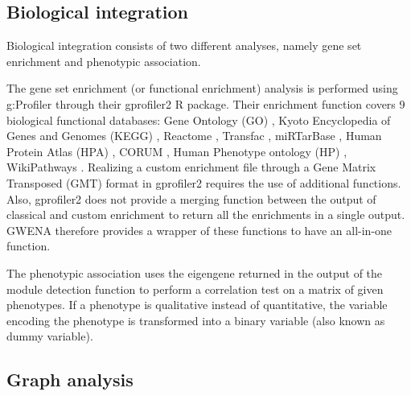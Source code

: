 \subsection{Biological integration}

Biological integration consists of two different analyses, namely gene set enrichment and phenotypic association. 

The gene set enrichment (or functional enrichment) analysis is performed using g:Profiler  through their gprofiler2 R package. Their enrichment function covers 9 biological functional databases: Gene Ontology (GO) , Kyoto Encyclopedia of Genes and Genomes (KEGG) , Reactome , Transfac , miRTarBase , Human Protein Atlas (HPA) , CORUM , Human Phenotype ontology (HP) , WikiPathways . Realizing a custom enrichment file through a Gene Matrix Transposed (GMT) format in gprofiler2 requires the use of additional functions. Also, gprofiler2 does not provide a merging function between the output of classical and custom enrichment to return all the enrichments in a single output. GWENA therefore provides a wrapper of these functions to have an all-in-one function.

The phenotypic association uses the eigengene returned in the output of the module detection function to perform a correlation test on a matrix of given phenotypes. If a phenotype is qualitative instead of quantitative, the variable encoding the phenotype is transformed into a binary variable (also known as dummy variable). 


\subsection{Graph analysis}

